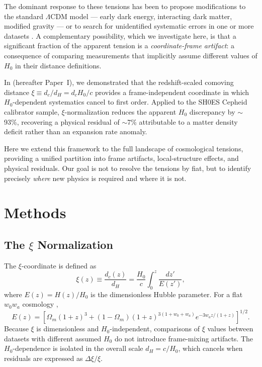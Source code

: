 \documentclass[twocolumn]{aastex631}
\begin{document}
The dominant response to these tensions has been to propose modifications to the
standard $\Lambda$CDM model --- early dark energy, interacting dark matter,
modified gravity --- or to search for unidentified systematic errors in one or more
datasets \citep{DiValentino2021}.
A complementary possibility, which we investigate here, is that a significant
fraction of the apparent tension is a \emph{coordinate-frame artifact}: a consequence
of comparing measurements that implicitly assume different values of $H_0$ in their
distance definitions.

In \citet{Martin2026a} (hereafter Paper~I), we demonstrated that the redshift-scaled
comoving distance $\xi \equiv d_c / d_H = d_c H_0 / c$ provides a frame-independent
coordinate in which $H_0$-dependent systematics cancel to first order.
Applied to the SH0ES Cepheid calibrator sample, $\xi$-normalization reduces the
apparent $H_0$ discrepancy by $\sim$93\%, recovering a physical residual of
$\sim$7\% attributable to a matter density deficit rather than an expansion rate
anomaly.

Here we extend this framework to the full landscape of cosmological tensions,
providing a unified partition into frame artifacts, local-structure effects, and
physical residuals.
Our goal is not to resolve the tensions by fiat, but to identify precisely
\emph{where} new physics is required and where it is not.


\section{Methods}

\subsection{The $\xi$ Normalization}

The $\xi$-coordinate is defined as
\begin{equation}
  \xi(z) \equiv \frac{d_c(z)}{d_H} = \frac{H_0}{c} \int_0^z \frac{dz'}{E(z')},
  \label{eq:xi}
\end{equation}
where $E(z) = H(z)/H_0$ is the dimensionless Hubble parameter.
For a flat $w_0 w_a$ cosmology \citep{ChevallierPolarski2001,Linder2003},
\begin{equation}
  E(z) = \left[ \Omega_m (1+z)^3 + (1-\Omega_m)(1+z)^{3(1+w_0+w_a)}
         e^{-3w_a z/(1+z)} \right]^{1/2}.
\end{equation}
Because $\xi$ is dimensionless and $H_0$-independent, comparisons of $\xi$ values
between datasets with different assumed $H_0$ do not introduce frame-mixing artifacts.
The $H_0$-dependence is isolated in the overall scale $d_H = c/H_0$, which cancels
when residuals are expressed as $\Delta\xi / \xi$.
\end{document}
